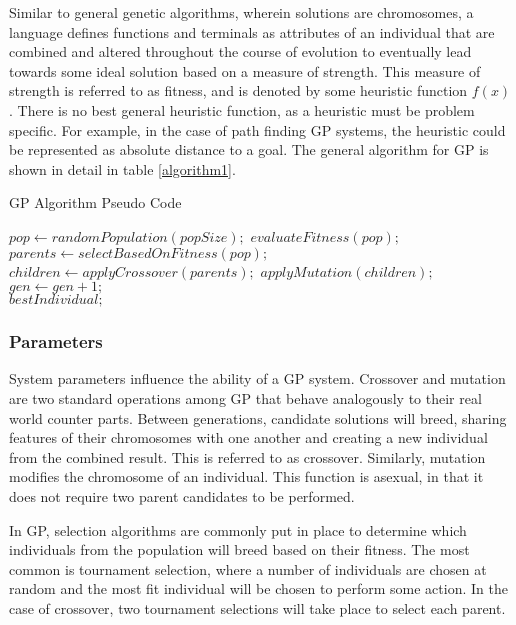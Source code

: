 \documentclass[12pt, letterpaper]{article}
\begin{document}
\textrm{ \indent Similar to general genetic algorithms, wherein solutions are chromosomes, a language defines functions and terminals as attributes of an individual that are combined and altered throughout the course of evolution to eventually lead towards some ideal solution based on a measure of strength. This measure of strength is referred to as fitness, and is denoted by some heuristic function $f(x)$. There is no best general heuristic function, as a heuristic must be problem specific. For example, in the case of path finding GP systems, the heuristic could be represented as absolute distance to a goal. The general algorithm for GP is shown in detail in table \ref{algorithm1}.}

\begin{table}[!htb]
\centering
\caption{GP Algorithm Pseudo Code}
\label{algorithm1}
\begin{singlespace}
\begin{algorithmic}
\State $pop \gets randomPopulation(popSize);$
    \State $evaluateFitness(pop);$
    \State $parents \gets selectBasedOnFitness(pop);$
    \State $children \gets applyCrossover(parents);$
    \State $applyMutation(children);$
    \State $gen \gets gen + 1;$
\EndFor 
\\
\Return $bestIndividual;$
\end{algorithmic}
\end{singlespace}
\end{table}

\subsubsection{Parameters}
\textrm{ \indent System parameters influence the ability of a GP system. Crossover and mutation are two standard operations among GP that behave analogously to their real world counter parts. Between generations, candidate solutions will breed, sharing features of their chromosomes with one another and creating a new individual from the combined result. This is referred to as crossover. Similarly, mutation modifies the chromosome of an individual. This function is asexual, in that it does not require two parent candidates to be performed. }

\textrm{ \indent In GP, selection algorithms are commonly put in place to determine which individuals from the population will breed based on their fitness. The most common is tournament selection, where a number of individuals are chosen at random and the most fit individual will be chosen to perform some action. In the case of crossover, two tournament selections will take place to select each parent. }
\end{document}
